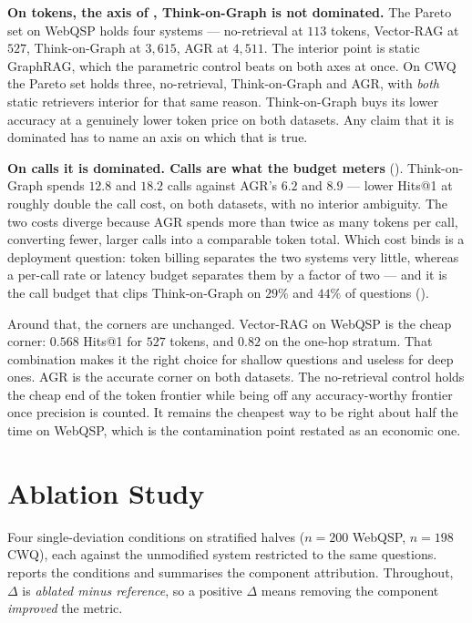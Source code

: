 \textbf{On tokens, the axis of , Think-on-Graph is not
dominated.} The Pareto set on WebQSP holds four systems --- no-retrieval at
$113$ tokens, Vector-RAG at $527$, Think-on-Graph at $3{,}615$, AGR at
$4{,}511$. The interior point is static GraphRAG, which the parametric control
beats on both axes at once. On CWQ the Pareto set holds three, no-retrieval,
Think-on-Graph and AGR, with \emph{both} static retrievers interior for that
same reason. Think-on-Graph buys its lower accuracy at a genuinely lower token
price on both datasets. Any claim that it is dominated has to name an axis
on which that is true.

\textbf{On calls it is dominated. Calls are what the budget meters}
(). Think-on-Graph spends $12.8$ and $18.2$ calls against
AGR's $6.2$ and $8.9$ --- lower Hits@1 at roughly double the call cost, on both
datasets, with no interior ambiguity. The two costs diverge because AGR spends
more than twice as many tokens per call, converting fewer, larger calls into a
comparable token total. Which cost binds is a deployment question: token billing
separates the two systems very little, whereas a per-call rate or latency budget
separates them by a factor of two --- and it is the call budget that clips
Think-on-Graph on $29\%$ and $44\%$ of questions ().

Around that, the corners are unchanged. Vector-RAG on WebQSP is the cheap
corner: $0.568$ Hits@1 for $527$ tokens, and $0.82$ on the one-hop stratum. That
combination makes it the right choice for shallow questions and useless for
deep ones. AGR is the accurate corner on both datasets. The no-retrieval
control holds the cheap end of the token frontier while being off any
accuracy-worthy frontier once precision is counted. It remains the cheapest way
to be right about half the time on WebQSP, which is the contamination point
restated as an economic one.

\section{Ablation Study}\label{sec:ablations}

Four single-deviation conditions on stratified halves ($n = 200$ WebQSP, $n =
198$ CWQ), each against the unmodified system restricted to the same questions.
 reports the conditions and  summarises the
component attribution. Throughout, $\Delta$ is \emph{ablated minus reference},
so a positive $\Delta$ means removing the component \emph{improved} the metric.


